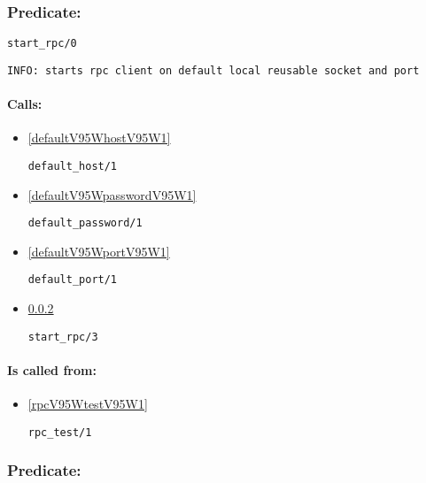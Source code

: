 \subsubsection{Predicate:} \label{startV95WrpcV95W0}

\begin{verbatim}
start_rpc/0
\end{verbatim}

{\small \begin{verbatim}
INFO: starts rpc client on default local reusable socket and port

\end{verbatim}}
\paragraph{Calls:} 
\begin{itemize}
\item \ref{defaultV95WhostV95W1} 
\begin{verbatim}
default_host/1
\end{verbatim}

\item \ref{defaultV95WpasswordV95W1} 
\begin{verbatim}
default_password/1
\end{verbatim}

\item \ref{defaultV95WportV95W1} 
\begin{verbatim}
default_port/1
\end{verbatim}

\item \ref{startV95WrpcV95W3} 
\begin{verbatim}
start_rpc/3
\end{verbatim}

\end{itemize}
\paragraph{Is called from:} 
\begin{itemize}
\item \ref{rpcV95WtestV95W1} 
\begin{verbatim}
rpc_test/1
\end{verbatim}

\end{itemize}

\subsubsection{Predicate:} \label{startV95WrpcV95W3}

